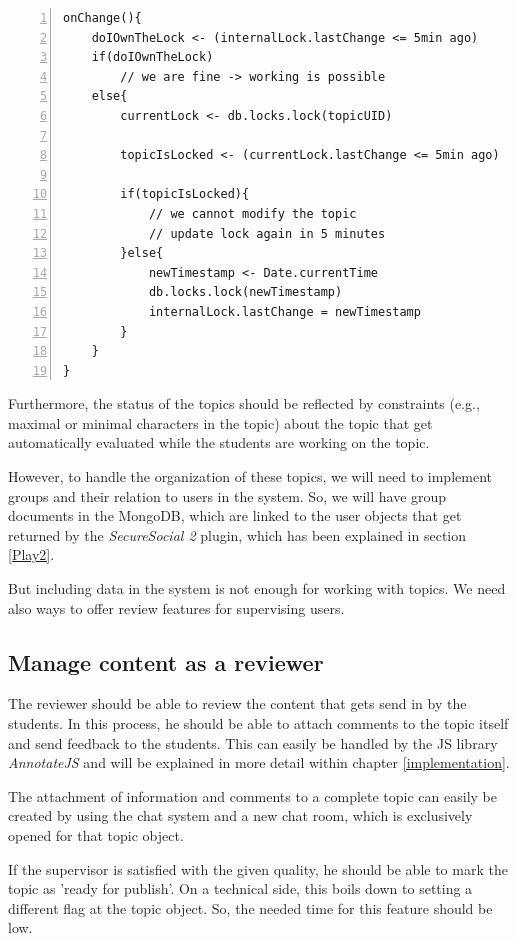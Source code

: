 \begin{lstlisting}[numbers=left,caption={},label=locked,frame=tlbr,breaklines]
onChange(){
	doIOwnTheLock <- (internalLock.lastChange <= 5min ago)
	if(doIOwnTheLock)
		// we are fine -> working is possible
	else{
		currentLock <- db.locks.lock(topicUID)
		
		topicIsLocked <- (currentLock.lastChange <= 5min ago)
		
		if(topicIsLocked){
			// we cannot modify the topic
			// update lock again in 5 minutes
		}else{
			newTimestamp <- Date.currentTime
			db.locks.lock(newTimestamp)
			internalLock.lastChange = newTimestamp
		}
	}
}
\end{lstlisting}

Furthermore, the status of the topics should be reflected by constraints (e.g., maximal or minimal characters in the topic) about the topic that get automatically evaluated while the students are working on the topic. 

However, to handle the organization of these topics, we will need to implement groups and their relation to users in the system. So, we will have group documents in the MongoDB, which are linked to the user objects that get returned by the \emph{SecureSocial 2} plugin, which has been explained in section \ref{Play2}.

But including data in the system is not enough for working with topics. We need also ways to offer review features for supervising users. 

\subsection{Manage content as a reviewer}
The reviewer should be able to review the content that gets send in by the students. In this process, he should be able to attach comments to the topic itself and send feedback to the students. This can easily be handled by the \ac{JS} library \emph{AnnotateJS} and will be explained in more detail within chapter \ref{implementation}.

The attachment of information and comments to a complete topic can easily be created by using the chat system and a new chat room, which is exclusively opened for that topic object. 

If the supervisor is satisfied with the given quality, he should be able to mark the topic as 'ready for publish'. On a technical side, this boils down to setting a different flag at the topic object. So, the needed time for this feature should be low.

